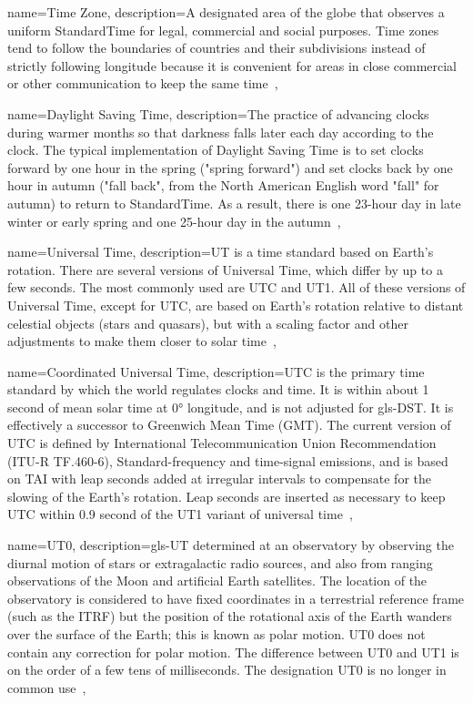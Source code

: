  {
	name={Time Zone},
	description={A designated area of the globe that observes a uniform \gls{StandardTime} for legal, commercial and social purposes. Time zones tend to follow the boundaries of countries and their subdivisions instead of strictly following longitude because it is convenient for areas in close commercial or other communication to keep the same time~\cite{TimeZone2021}},
}

 {
	name={Daylight Saving Time},
	description={The practice of advancing clocks during warmer months so that darkness falls later each day according to the clock. The typical implementation of Daylight Saving Time is to set clocks forward by one hour in the spring ("spring forward") and set clocks back by one hour in autumn ("fall back", from the North American English word "fall" for autumn) to return to \gls{StandardTime}. As a result, there is one 23-hour day in late winter or early spring and one 25-hour day in the autumn~\cite{DaylightSavingTime2021}},
}

 {
	name={Universal Time},
	description={\acrshort{UT} is a time standard based on Earth's rotation. There are several versions of Universal Time, which differ by up to a few seconds. The most commonly used are \gls{UTC} and \gls{UT1}. All of these versions of Universal Time, except for \gls{UTC}, are based on Earth's rotation relative to distant celestial objects (stars and quasars), but with a scaling factor and other adjustments to make them closer to solar time~\cite{UniversalTime2020}},
}

 {
	name={Coordinated Universal Time},
	description={\acrshort{UTC} is the primary time standard by which the world regulates clocks and time. It is within about 1 second of mean solar time at 0° longitude, and is not adjusted for \gls{gls-DST}. It is effectively a successor to Greenwich Mean Time (GMT). The current version of \gls{UTC} is defined by International Telecommunication Union Recommendation (ITU-R TF.460-6), Standard-frequency and time-signal emissions, and is based on \gls{TAI} with leap seconds added at irregular intervals to compensate for the slowing of the Earth's rotation. Leap seconds are inserted as necessary to keep \gls{UTC} within 0.9 second of the \gls{UT1} variant of universal time~\cite{CoordinatedUniversalTime2020}},
}

 {
	name={UT0},
	description={\gls{gls-UT} determined at an observatory by observing the diurnal motion of stars or extragalactic radio sources, and also from ranging observations of the Moon and artificial Earth satellites. The location of the observatory is considered to have fixed coordinates in a terrestrial reference frame (such as the \gls{ITRF}) but the position of the rotational axis of the Earth wanders over the surface of the Earth; this is known as polar motion. UT0 does not contain any correction for polar motion. The difference between UT0 and \gls{UT1} is on the order of a few tens of milliseconds. The designation UT0 is no longer in common use~\cite{UniversalTime2020}},
}

